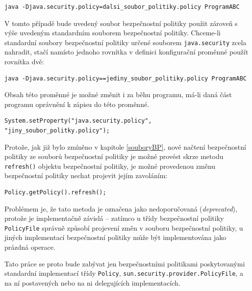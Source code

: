 \begin{lstlisting}[caption=Spuštění JVM s vlastním souborem bezpečnostní politiky, label=nastaveniBP]
java -Djava.security.policy=dalsi_soubor_politiky.policy ProgramABC
\end{lstlisting}

V tomto případě bude uvedený soubor bezpečnostní politiky použit zároveň s výše uvedeným standardním souborem bezpečnostní politiky. Chceme-li standardní soubory bezpečnostní politiky určené souborem {\tt java.security} zcela nahradit, stačí namísto jednoho rovnítka v definici konfigurační proměnné použít rovnítka dvě: \cite[5.3.1]{oaks}

\begin{lstlisting}[caption=Spuštění JVM jen s vlastním souborem bezpečnostní politiky, label=nastaveniBP2]
java -Djava.security.policy==jediny_soubor_politiky.policy ProgramABC
\end{lstlisting}

Obsah této proměnné je možné změnit i za běhu programu, má-li daná část programu oprávnění k zápisu do této proměnné.

\begin{lstlisting}[caption=Nastavení souboru bezpečnostní politiky zevnitř JVM, label=nastaveniBP3]
System.setProperty("java.security.policy", "jiny_soubor_politky.policy");
\end{lstlisting}

Protože, jak již bylo zmíněno v kapitole \ref{souboryBP}, nové načtení bezpečnostní politiky ze souborů bezpečnostní politiky je možné provést
skrze metodu {\tt refresh()} objektu bezpečnostní politiky, je možné provedenou změnu bezpečnostní politiky nechat projevit jejím zavoláním:

\begin{lstlisting}[caption=Znovunačtení souboru bezpečnostní politiky, label=refreshBP]
Policy.getPolicy().refresh();
\end{lstlisting}

Problémem je, že tato metoda je označena jako nedoporučovaná ({\it deprecated}), protože je implementačně závislá -- zatímco u třídy bezpečnostní politiky {\tt PolicyFile} správně způsobí projevení změn v souboru bezpečnostní politiky, u jiných implementací bezpečnostní politiky může být implementována jako prázdná operace. \cite{refPolicy}

Tato práce se proto bude zabývat jen bezpečnostními politikami poskytovanými standardní implementací třídy {\tt Policy}, {\tt sun.security.provider.PolicyFile}, a na ní postavených nebo na ni delegujících implementacích.

